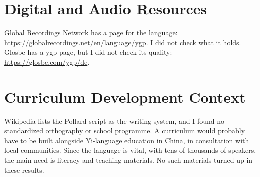 \documentclass[12pt]{article}
\begin{document}
\section{Digital and Audio Resources}
Global Recordings Network has a page for the language: \url{https://globalrecordings.net/en/language/ygp}. I did not check what it holds. Glosbe has a ygp page, but I did not check its quality: \url{https://glosbe.com/ygp/de}.

\section{Curriculum Development Context}
Wikipedia lists the Pollard script as the writing system, and I found no standardized orthography or school programme. A curriculum would probably have to be built alongside Yi-language education in China, in consultation with local communities. Since the language is vital, with tens of thousands of speakers, the main need is literacy and teaching materials. No such materials turned up in these results.
\end{document}
